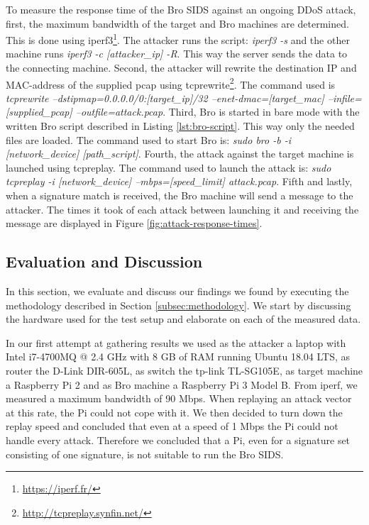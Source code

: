 To measure the response time of the Bro SIDS against an ongoing DDoS attack, first, the maximum bandwidth of the target and Bro machines are determined. This is done using iperf3\footnote{\url{https://iperf.fr/}}. The attacker runs the script: \emph{iperf3 -s} and the other machine runs \emph{iperf3 -c [attacker\_ip] -R}. This way the server sends the data to the connecting machine. Second, the attacker will rewrite the destination IP and MAC-address of the supplied pcap using tcprewrite\footnote{\url{http://tcpreplay.synfin.net/}}. The command used is \emph{tcprewrite --dstipmap=0.0.0.0/0:[target\_ip]/32 --enet-dmac=[target\_mac] --infile=[supplied\_pcap] --outfile=attack.pcap}. Third, Bro is started in bare mode with the written Bro script described in Listing \ref{lst:bro-script}. This way only the needed files are loaded. The command used to start Bro is: \emph{sudo bro -b -i [network\_device] [path\_script]}. Fourth, the attack against the target machine is launched using tcpreplay. The command used to launch the attack is: \emph{sudo tcpreplay -i [network\_device] --mbps=[speed\_limit] attack.pcap}. Fifth and lastly, when a signature match is received, the Bro machine will send a message to the attacker. The times it took of each attack between launching it and receiving the message are displayed in Figure \ref{fig:attack-response-times}.



\subsection{Evaluation and Discussion}\label{subsec:evaluation-discussion}
In this section, we evaluate and discuss our findings we found by executing the methodology described in Section \ref{subsec:methodology}. We start by discussing the hardware used for the test setup and elaborate on each of the measured data.

In our first attempt at gathering results we used as the attacker a laptop with Intel i7-4700MQ @ 2.4 GHz with 8 GB of RAM running Ubuntu 18.04 LTS, as router the D-Link DIR-605L, as switch the tp-link TL-SG105E, as target machine a Raspberry Pi 2 and as Bro machine a Raspberry Pi 3 Model B. From iperf, we measured a maximum bandwidth of 90 Mbps. When replaying an attack vector at this rate, the Pi could not cope with it. We then decided to turn down the replay speed and concluded that even at a speed of 1 Mbps the Pi could not handle every attack. Therefore we concluded that a Pi, even for a signature set consisting of one signature, is not suitable to run the Bro SIDS.  

